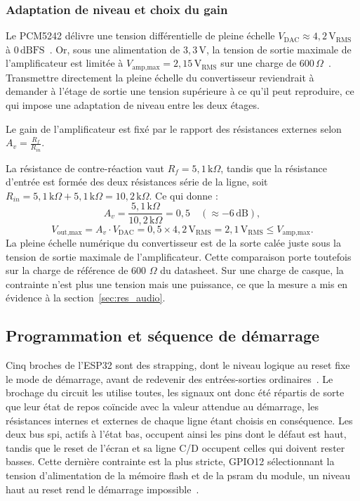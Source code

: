 \subsubsection{Adaptation de niveau et choix du gain}

Le PCM5242 délivre une tension différentielle de pleine échelle $V_{\text{DAC}} \approx 4{,}2\,\text{V}_{\text{RMS}}$ à $0\,\text{dBFS}$~\cite{TI_PCM5242}. Or, sous une alimentation de $3{,}3\,\text{V}$, la tension de sortie maximale de l'amplificateur est limitée à $V_{\text{amp,max}} = 2{,}15\,\text{V}_{\text{RMS}}$ sur une charge de $600\,\Omega$~\cite{analog_MAX97220A}. Transmettre directement la pleine échelle du convertisseur reviendrait à demander à l'étage de sortie une tension supérieure à ce qu'il peut reproduire, ce qui impose une adaptation de niveau entre les deux étages.

Le gain de l'amplificateur est fixé par le rapport des résistances externes selon $A_v = \frac{R_f}{R_{in}}$.

La résistance de contre-réaction vaut $R_f = 5{,}1\,\text{k}\Omega$, tandis que la résistance d'entrée est formée des deux résistances série de la ligne, soit $R_{in} = 5{,}1\,\text{k}\Omega + 5{,}1\,\text{k}\Omega = 10{,}2\,\text{k}\Omega$. Ce qui donne :
\begin{equation}
  A_v = \frac{5{,}1\,\text{k}\Omega}{10{,}2\,\text{k}\Omega} = 0{,}5 \quad (\approx -6\,\text{dB}),
\end{equation}
\begin{equation}
  V_{\text{out,max}} = A_v \cdot V_{\text{DAC}} = 0{,}5 \times 4{,}2\,\text{V}_{\text{RMS}} = 2{,}1\,\text{V}_{\text{RMS}} \le V_{\text{amp,max}}.
\end{equation}
La pleine échelle numérique du convertisseur est de la sorte calée juste sous la tension de sortie maximale de l'amplificateur. Cette comparaison porte toutefois sur la charge de référence de 600 $\Omega$ du datasheet. Sur une charge de casque, la contrainte n'est plus une tension mais une puissance, ce que la mesure a mis en évidence à la section~\ref{sec:res_audio}.


\subsection{Programmation et séquence de démarrage}
\label{sec:autoflash}

Cinq broches de l'ESP32 sont des \gls{strapping}, dont le niveau logique au reset fixe le mode de démarrage, avant de redevenir des entrées-sorties ordinaires~\cite{ESP32_WROVER-E_Datasheet}. Le brochage du circuit les utilise toutes, les signaux ont donc été répartis de sorte que leur état de repos coïncide avec la valeur attendue au démarrage, les résistances internes et externes de chaque ligne étant choisis en conséquence. Les deux bus \gls{spi}, actifs à l'état bas, occupent ainsi les pins dont le défaut est haut, tandis que le reset de l'écran et sa ligne C/D occupent celles qui doivent rester basses. Cette dernière contrainte est la plus stricte, GPIO12 sélectionnant la tension d'alimentation de la mémoire flash et de la \gls{psram} du module, un niveau haut au reset rend le démarrage impossible~\cite{ESP32_WROVER-E_Datasheet}.

